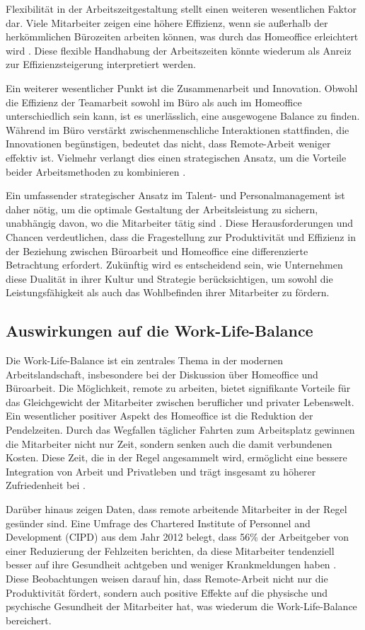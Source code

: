 Flexibilität in der Arbeitszeitgestaltung stellt einen weiteren wesentlichen Faktor dar. Viele Mitarbeiter zeigen eine höhere Effizienz, wenn sie außerhalb der herkömmlichen Bürozeiten arbeiten können, was durch das Homeoffice erleichtert wird \cite{file2}. Diese flexible Handhabung der Arbeitszeiten könnte wiederum als Anreiz zur Effizienzsteigerung interpretiert werden.

Ein weiterer wesentlicher Punkt ist die Zusammenarbeit und Innovation. Obwohl die Effizienz der Teamarbeit sowohl im Büro als auch im Homeoffice unterschiedlich sein kann, ist es unerlässlich, eine ausgewogene Balance zu finden. Während im Büro verstärkt zwischenmenschliche Interaktionen stattfinden, die Innovationen begünstigen, bedeutet das nicht, dass Remote-Arbeit weniger effektiv ist. Vielmehr verlangt dies einen strategischen Ansatz, um die Vorteile beider Arbeitsmethoden zu kombinieren \cite{7}. 

Ein umfassender strategischer Ansatz im Talent- und Personalmanagement ist daher nötig, um die optimale Gestaltung der Arbeitsleistung zu sichern, unabhängig davon, wo die Mitarbeiter tätig sind \cite{7}. Diese Herausforderungen und Chancen verdeutlichen, dass die Fragestellung zur Produktivität und Effizienz in der Beziehung zwischen Büroarbeit und Homeoffice eine differenzierte Betrachtung erfordert. Zukünftig wird es entscheidend sein, wie Unternehmen diese Dualität in ihrer Kultur und Strategie berücksichtigen, um sowohl die Leistungsfähigkeit als auch das Wohlbefinden ihrer Mitarbeiter zu fördern.

\subsection{Auswirkungen auf die Work-Life-Balance}  
Die Work-Life-Balance ist ein zentrales Thema in der modernen Arbeitslandschaft, insbesondere bei der Diskussion über Homeoffice und Büroarbeit. Die Möglichkeit, remote zu arbeiten, bietet signifikante Vorteile für das Gleichgewicht der Mitarbeiter zwischen beruflicher und privater Lebenswelt. Ein wesentlicher positiver Aspekt des Homeoffice ist die Reduktion der Pendelzeiten. Durch das Wegfallen täglicher Fahrten zum Arbeitsplatz gewinnen die Mitarbeiter nicht nur Zeit, sondern senken auch die damit verbundenen Kosten. Diese Zeit, die in der Regel angesammelt wird, ermöglicht eine bessere Integration von Arbeit und Privatleben und trägt insgesamt zu höherer Zufriedenheit bei \cite{file4}.

Darüber hinaus zeigen Daten, dass remote arbeitende Mitarbeiter in der Regel gesünder sind. Eine Umfrage des Chartered Institute of Personnel and Development (CIPD) aus dem Jahr 2012 belegt, dass 56\% der Arbeitgeber von einer Reduzierung der Fehlzeiten berichten, da diese Mitarbeiter tendenziell besser auf ihre Gesundheit achtgeben und weniger Krankmeldungen haben \cite{file4}. Diese Beobachtungen weisen darauf hin, dass Remote-Arbeit nicht nur die Produktivität fördert, sondern auch positive Effekte auf die physische und psychische Gesundheit der Mitarbeiter hat, was wiederum die Work-Life-Balance bereichert.

